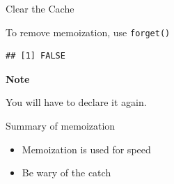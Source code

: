 \begin{frame}[fragile]{Clear the Cache}

To remove memoization, use \texttt{forget()}

\begin{Shaded}
\begin{Highlighting}[]
\NormalTok{(}\NormalTok{(}\NormalTok{))}
\end{Highlighting}
\end{Shaded}

\begin{verbatim}
## [1] FALSE
\end{verbatim}

\textbf{Note}

You will have to declare it again.

\end{frame}

\begin{frame}{Summary of memoization}

\begin{itemize}
\tightlist
\item
  Memoization is used for speed
\item
  Be wary of the catch
\end{itemize}

\end{frame}
